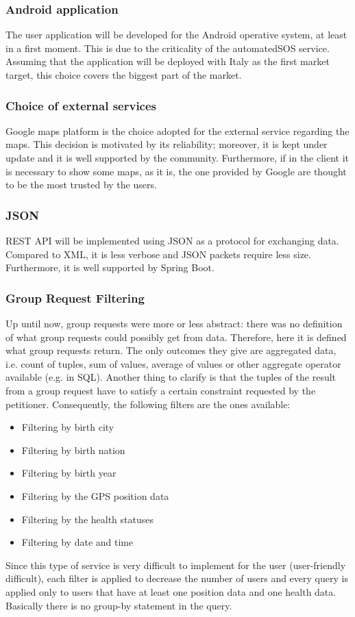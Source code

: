 \subsubsection{Android application} 	 
The user application will be developed for the Android operative system, at least in a first moment. This is due to the criticality of the
automatedSOS service. Assuming that the application will be deployed with Italy as the first market target, this choice covers the biggest
part of the market.

\subsubsection{Choice of external services}
Google maps platform is the choice adopted for the external service regarding the maps. This decision is motivated by its reliability;
moreover, it is kept under update and it is well supported by the community. Furthermore, if in the client it is necessary to show some maps,
as it is, the one provided by Google are thought to be the most trusted by the users. 


\subsubsection{JSON}
REST API will be implemented using JSON as a protocol for exchanging data. \\
Compared to XML, it is less verbose and JSON packets require less size. Furthermore, it is well supported
by Spring Boot. 

\subsubsection{Group Request Filtering}
Up until now, group requests were more or less abstract: there was no definition of what group requests could possibly get from 
data. Therefore, here it is defined what group requests return. The only outcomes they give are  aggregated data, i.e. count 
of tuples, sum of values, average of values or other aggregate operator available (e.g. in SQL). Another thing to clarify is that 
the tuples of the result from a group request have to satisfy a certain constraint requested by the petitioner. Consequently, 
the following filters are the ones available:
\begin{itemize}
\item Filtering by birth city
\item Filtering by birth nation
\item Filtering by birth year
\item Filtering by the GPS position data
\item Filtering by the health statuses
\item Filtering by date and time
\end{itemize}
Since this type of service is very difficult to implement for the user (user-friendly difficult), each filter is applied to decrease the number of users and every query is applied only to users that have at least one position data and one health data. Basically there is no group-by statement in the query.